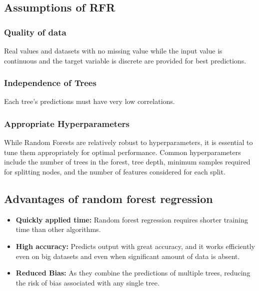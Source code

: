 \subsection{Assumptions of RFR}
\subsubsection{Quality of data}
\tab Real values and datasets with no missing value while the input value is continuous and the target variable is discrete are provided for best predictions. 

\subsubsection{Independence of Trees}
\tab Each tree's predictions must have very low correlations.  

\subsubsection{Appropriate Hyperparameters}
\tab While Random Forests are relatively robust to hyperparameters, it is essential to tune them appropriately for optimal performance. Common hyperparameters include the number of trees in the forest, tree depth, minimum samples required for splitting nodes, and the number of features considered for each split. 

\subsection{Advantages of random forest regression}

    \begin{itemize}
        \item \textbf{Quickly applied time:} Random forest regression requires shorter training time than other algorithms.
        \item \textbf{High accuracy:} Predicts output with great accuracy, and it works efficiently even on big datasets and even when significant amount of data is absent.
        \item \textbf{Reduced Bias:} As they combine the predictions of multiple trees, reducing the risk of bias associated with any single tree. 
    \end{itemize}